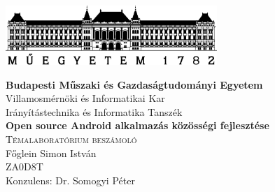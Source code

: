 \begin{titlepage}
	\begin{center}
		\includegraphics[keepaspectratio, width=8cm]{include/BME1782.eps} \\
		\vspace{5mm}

		\large \textbf{Budapesti Műszaki és Gazdaságtudományi Egyetem} \\
		Villamosmérnöki és Informatikai Kar \\
		Irányítástechnika és Informatika Tanszék \\
		\vspace{3cm}
		\huge \textbf{Open source Android alkalmazás közösségi fejlesztése}  \\
		\vspace{1cm}
		\textsc{Témalaboratórium beszámoló} \\
		\vfill
		\Large Főglein Simon István \\ ZA0D8T \\
		\vspace{1.6cm}
		\large Konzulens: Dr. Somogyi Péter
		\vfill
		\large {}
	\end{center}
\end{titlepage}
